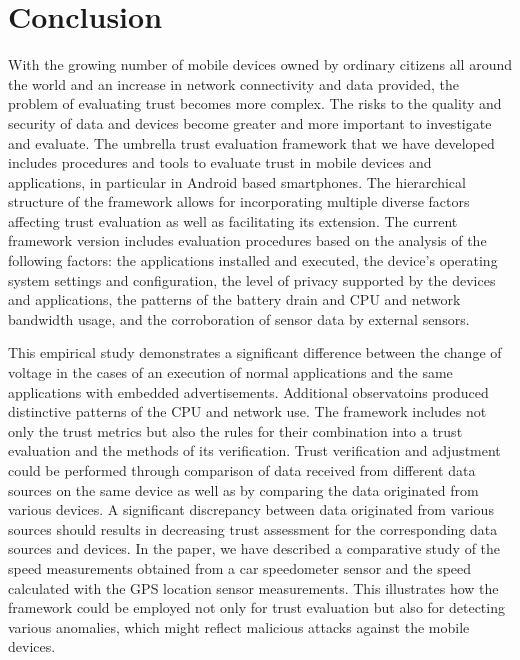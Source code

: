 \section{Conclusion}
With the growing number of mobile devices owned by ordinary citizens all around the world and an increase 
in network connectivity and data provided, the problem of evaluating trust becomes 
more complex.  The risks to
the quality and security of data and devices become greater and more important to investigate and evaluate. The 
umbrella trust evaluation 
framework that we have developed includes procedures and tools to evaluate trust in mobile devices and applications, in particular in Android based smartphones. 
The  hierarchical structure of the framework allows for incorporating multiple diverse factors affecting trust evaluation as well as facilitating its extension.
The current framework version includes evaluation procedures based on the analysis of the following factors: the applications installed and executed, the device’s operating system settings and configuration, the level of privacy supported by the devices and applications, the patterns of the battery drain and CPU and network bandwidth usage,
and the corroboration of sensor data by external sensors.

This empirical study demonstrates a significant difference between the change of voltage in the cases of an execution 
of normal applications and the same applications with embedded advertisements.  Additional observatoins produced distinctive patterns of the CPU and network use.
The framework includes not only the trust metrics but also the rules for their combination into a trust
evaluation and the methods of its verification. 
Trust verification and adjustment could be performed through comparison of data received from different data sources on the 
same device as well as by comparing the data originated from various devices. A significant discrepancy between data 
originated from various sources should results in decreasing trust assessment for the corresponding data sources and devices. 
In the paper, we have described a comparative study of the speed measurements obtained from a car speedometer sensor 
and the speed calculated 
with the GPS location sensor measurements. This illustrates how the framework could be employed not only for trust evaluation 
but also for detecting various anomalies, which might reflect malicious attacks against the mobile devices.

